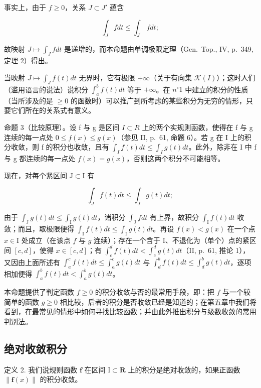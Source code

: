 事实上，由于 \(f \geqslant 0\)，关系 \(J \subset J'\) 蕴含

\[
\int_ {J} f d t \leqslant \int_ {J ^ {\prime}} f d t;
\]

故映射 \(J \mapsto \int_{J} f dt\) 是递增的，而本命题由单调极限定理（Gen.~Top., IV, p.~349, 定理 2）得出。

当映射 \(J \mapsto \int_{J} f(t) dt\) 无界时，它有极限 \(+\infty\)（关于有向集 \(\mathcal{K}(I)\)）；这时人们（滥用语言的说法）说积分 \(\int_{a}^{b} f(t) dt\) 等于 \(+\infty\)。在 \(n^{\circ} 1\) 中建立的积分的性质（当所涉及的是 \(\geqslant 0\) 的函数时）可以推广到所考虑的某些积分为无穷的情形，只要它们所在的关系式有意义。

命题 3（比较原理）。设 f 与 g 是区间 \(I \subset R\) 上的两个实规则函数，使得在 f 与 g 连续的每一点处 \(0 \leqslant f(x) \leqslant g(x)\)（参见 II, p.~61, 命题 6）。若 g 在 I 上的积分收敛，则 f 的积分也收敛，且有 \(\int_{I} f(t) dt \leqslant \int_{I} g(t) dt\)。此外，除非在 I 中 f 与 g 都连续的每一点处 \(f(x) = g(x)\)，否则这两个积分不可能相等。

现在，对每个紧区间 \(\mathrm{J} \subset \mathrm{I}\) 有

\[
\int_ {J} f (t) d t \leqslant \int_ {J} g (t) d t;
\]

由于 \(\int_{\mathrm{J}} g(t) dt \leqslant \int_{\mathrm{I}} g(t) dt\)，诸积分 \(\int_{\mathrm{J}} f dt\) 有上界，故积分 \(\int_{\mathrm{I}} f(t) dt\) 收敛；而且，取极限便得 \(\int_{\mathrm{I}} f(t) dt \leqslant \int_{\mathrm{I}} g(t) dt\)。再设 \(f(x) < g(x)\) 在一个点 \(x \in \mathrm{I}\) 处成立（在该点 \(f\) 与 \(g\) 连续）；存在一个含于 I、不退化为（单个）点的紧区间 \([c, d]\)，使得 \(x \in [c, d]\)；有 \(\int_{c}^{d} f(t) dt < \int_{c}^{d} g(t) dt\)（II, p.~61, 推论 1），又因由上面所述有 \(\int_{a}^{c} f(t) dt \leqslant \int_{a}^{c} g(t) dt\) 与 \(\int_{d}^{b} f(t) dt \leqslant \int_{d}^{b} g(t) dt\)，逐项相加便得 \(\int_{a}^{b} f(t) dt < \int_{a}^{b} g(t) dt\)。

本命题提供了判定函数 \(f \geqslant 0\) 的积分收敛与否的最常用手段，即：把 \(f\) 与一个较简单的函数 \(g \geqslant 0\) 相比较，后者的积分是否收敛已经是知道的；在第五章中我们将看到，在最常见的情形中如何寻找比较函数；并由此外推出积分与级数收敛的常用判别法。

\subsection{绝对收敛积分}

定义 2. 我们说规则函数 \(\mathbf{f}\) 在区间 \(\mathrm{I} \subset \mathbf{R}\) 上的积分是绝对收敛的，如果正函数 \(\| \mathbf{f}(x) \|\) 的积分收敛。

